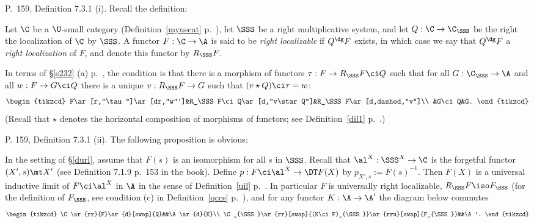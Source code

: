 \documentclass[12pt]{article}
\theoremstyle{remark}
\theoremstyle{definition}
\begin{document}
%

\begin{s} 
P.~159, Definition 7.3.1 (i). Recall the definition: 

Let $\C$ be a $\U$-small category (Definition~\ref{myuscat} p.~), let $\SSS$ be a right multiplicative system, and let $Q:\C\to\C_\SSS$ be the right the localization of $\C$ by $\SSS$. A functor $F:\C\to\A$ is said to be {\em right localizable} if $Q^\dg F$ exists, in which case we say that $Q^\dg F$ a {\em right localization} of $F$, and denote this functor by $R_\SSS F$. 


In terms of \S\ref{s232} (a) p.~, the condition is that there is a morphism of functors $\tau:F\to R_\SSS F\ci Q$ such that for all $G:\C_\SSS\to\A$ and all $w:F\to G\ci Q$ there is a unique $v:R_\SSS F\to G$ such that $(v\star Q)\ci\tau=w$: 
$$
\begin{tikzcd}
F\ar[r,"\tau"]\ar[dr,"w"']&R_\SSS F\ci Q\ar[d,"v\star Q"]&R_\SSS F\ar[d,dashed,"v"]\\ 
&G\ci Q&G.
\end{tikzcd}
$$ 
(Recall that $\star$ denotes the horizontal composition of morphisms of functors; see Definition~\ref{dil1} p.~.)
\end{s}

%

\begin{s}%


P. 159, Definition 7.3.1 (ii). The following proposition is obvious:

\begin{prop}
In the setting of \S\ref{durl}, assume that $F(s)$ is an isomorphism for all $s$ in $\SSS$. Recall that $\al^X:\SSS^X\to\C$ is the forgetful functor $(X',s)\mt X'$ (see Definition 7.1.9 p.~153 in the book). Define $p:F\ci\al^X\to\DT F(X)$ by $p_{X',s}:=F(s)^{-1}$. Then $F(X)$ is a universal inductive limit of $F\ci\al^X$ in $\A$ in the sense of Definition~\ref{uil} p.~. In particular $F$ is universally right localizable, %
$R_\SSS F\iso F_\SSS$ (for the definition of $F_\SSS$, see condition (c) in Definition~\ref{qccs} p.~), %
and for any functor $K:\A\to\A'$ the diagram below commutes %
$$
\begin{tikzcd}
\C\ar{rr}{F}\ar{d}[swap]{Q}&&\A\ar{d}{K}\\
\C_{\SSS}\ar{rr}[swap]{(K\ci F)_{\SSS}}\ar{rru}[swap]{F_{\SSS}}&&\A'.
\end{tikzcd}
$$ 
\end{prop}
\end{s}
\end{document}
